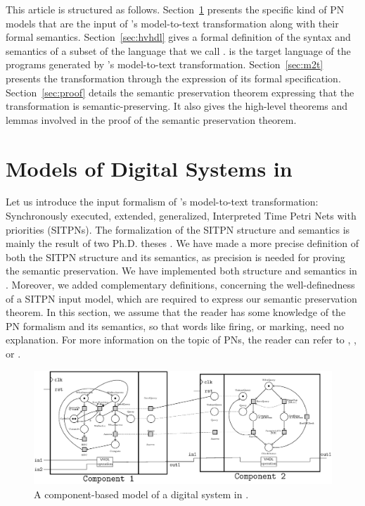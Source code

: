 \documentclass[pdflatex,sn-mathphys]{sn-jnl}%
\theoremstyle{thmstyleone}%
\theoremstyle{thmstyletwo}%
\theoremstyle{thmstylethree}%
\begin{document}
This article is structured as
follows. Section~\ref{sec:hilecop-models} presents the specific kind
of PN models that are the input of \hilecop{}'s model-to-text
transformation along with their formal semantics.
Section~\ref{sec:hvhdl} gives a formal definition of the syntax and
semantics of a subset of the \vhdl{} language that we call
\hvhdl{}. \hvhdl{} is the target language of the programs generated by
\hilecop{}'s model-to-text transformation.  Section~\ref{sec:m2t}
presents the transformation through the expression of its formal
specification.  Section~\ref{sec:proof} details the semantic
preservation theorem expressing that the \hilecop{} transformation is
semantic-preserving.  It also gives the high-level theorems and lemmas
involved in the proof of the semantic preservation theorem.  %

\section{Models of Digital Systems in \hilecop{}}
\label{sec:hilecop-models}

Let us introduce the input formalism of \hilecop{}'s model-to-text
transformation: Synchronously executed, extended, generalized,
Interpreted Time Petri Nets with priorities (SITPNs). The
formalization of the SITPN structure and semantics is mainly the
result of two Ph.D. theses \cite{Leroux2014,Merzoug2018}. We have made
a more precise definition of both the SITPN structure and its
semantics, as precision is needed for proving the semantic
preservation. We have implemented both structure and semantics in
\coq{}. Moreover, we added complementary definitions, concerning the
well-definedness of a SITPN input model, which are required to express
our semantic preservation theorem. In this section, we assume that the
reader has some knowledge of the PN formalism and its semantics, so
that words like firing, or marking, need no explanation. For more
information on the topic of PNs, the reader can refer to
\cite{David1994}, \cite{Murata1989}, or \cite{Diaz2001}.

\begin{figure}[H]
\centering
\includegraphics[keepaspectratio=true,width=\textwidth]{abs-model.eps}
\caption[An example of model of digital system in \hilecop{}.]{A
  component-based model of a digital system in \hilecop{}.}
\label{fig:abs-model}
\end{figure}
\end{document}
